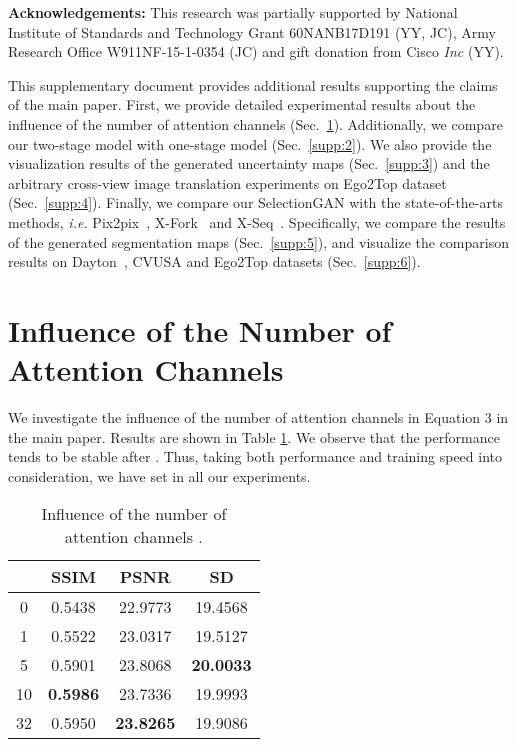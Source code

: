 \documentclass[10pt,twocolumn,letterpaper]{article}
\begin{document}
\small\noindent\textbf{Acknowledgements:} This research was partially supported by National Institute of Standards and Technology Grant 60NANB17D191 (YY, JC),  Army Research Office W911NF-15-1-0354 (JC) and gift donation from Cisco \textit{Inc} (YY).


{


}

\clearpage


This supplementary document provides additional results
supporting the claims of the main paper. 
First, we provide detailed experimental results about the influence of the number of attention channels (Sec.~\ref{supp:1}). Additionally, we compare our two-stage model with one-stage model (Sec.~\ref{supp:2}).
We also provide the visualization results of the generated uncertainty maps (Sec.~\ref{supp:3}) and the arbitrary cross-view image translation experiments on Ego2Top dataset \cite{ardeshir2016ego2top} (Sec.~\ref{supp:4}). 
Finally, we compare our SelectionGAN with the state-of-the-arts methods, \emph{i.e.} Pix2pix~\cite{isola2017image}, X-Fork~\cite{regmi2018cross} and X-Seq~\cite{regmi2018cross}.
Specifically, we compare the results of the generated segmentation maps (Sec.~\ref{supp:5}), and visualize the comparison results on Dayton~\cite{vo2016localizing}, CVUSA \cite{workman2015wide} and Ego2Top \cite{ardeshir2016ego2top} datasets (Sec.~\ref{supp:6}).

\section{Influence of the Number of Attention Channels }
\label{supp:1}
We investigate the influence of the number of attention channels  in Equation 3 in the main paper.
Results are shown in Table \ref{tab:attention_n}.
We observe that the performance tends to be stable after .
Thus, taking both performance and training speed into consideration, we have set  in all our experiments.

\begin{table}[!ht] \small
	\centering
	\caption{Influence of the number of attention channels .} 
	\begin{tabular}{c|c|c|c} \toprule
		   &  SSIM    & PSNR    & SD \\	\hline	
		0      & 0.5438 & 22.9773 & 19.4568  \\
		1      & 0.5522 & 23.0317 & 19.5127 \\ 
		5     &  0.5901  & 23.8068 & \textbf{20.0033} \\
		10    & \textbf{0.5986}  & 23.7336 & 19.9993 \\
		32	  & 0.5950  & \textbf{23.8265} & 19.9086 \\ 
		\bottomrule		
	\end{tabular}
	\label{tab:attention_n}
\end{table}
\end{document}
